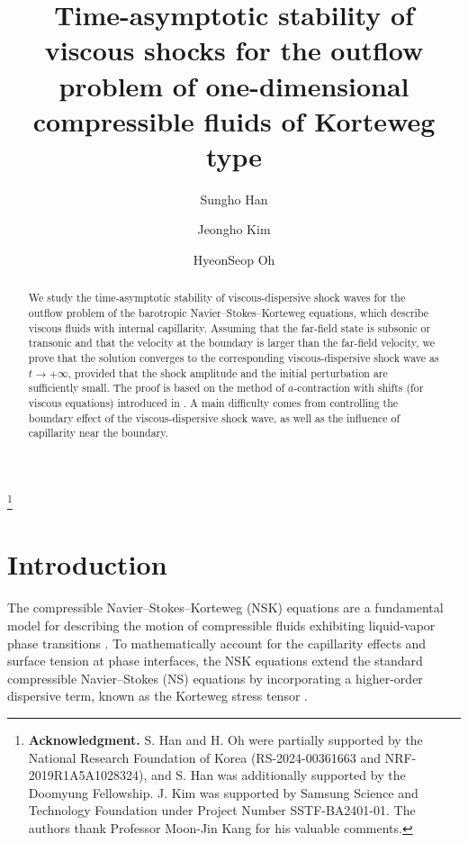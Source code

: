 \documentclass[11pt,reqno]{amsart}
\title[Outflow problem for the NSK equations]{Time-asymptotic stability of viscous shocks for the outflow problem of one-dimensional compressible fluids of Korteweg type}
\author[S. Han]{Sungho Han}
\author[J. Kim]{Jeongho Kim}
\author[H. Oh]{HyeonSeop Oh}
\numberwithin{equation}{section} %
\begin{document}


\thanks{\textbf{Acknowledgment.} S. Han and H. Oh were partially supported by the National Research Foundation of Korea (RS-2024-00361663 and NRF-2019R1A5A1028324), and S. Han was additionally supported by the Doomyung Fellowship. J. Kim was supported by Samsung Science and Technology Foundation under Project Number SSTF-BA2401-01. The authors thank Professor Moon-Jin Kang for his valuable comments.}

\begin{abstract} 
We study the time-asymptotic stability of viscous-dispersive shock waves for the outflow problem of the barotropic Navier--Stokes--Korteweg equations, which describe viscous fluids with internal capillarity. Assuming that the far-field state is subsonic or transonic and that the velocity at the boundary is larger than the far-field velocity, we prove that the solution converges to the corresponding viscous-dispersive shock wave as $t \to +\infty$, provided that the shock amplitude and the initial perturbation are sufficiently small. The proof is based on the method of $a$-contraction with shifts (for viscous equations) introduced in \cite{KV17,KV21,KVW23}. A main difficulty comes from controlling the boundary effect of the viscous-dispersive shock wave, as well as the influence of capillarity near the boundary.
\end{abstract}



\maketitle

\section{Introduction}%
\setcounter{equation}{0}

The compressible Navier--Stokes--Korteweg (NSK) equations are a fundamental model for describing the motion of compressible fluids exhibiting liquid-vapor phase transitions \cite{DS85, Kor01, VdW94}. To mathematically account for the capillarity effects and surface tension at phase interfaces, the NSK equations extend the standard compressible Navier--Stokes (NS) equations by incorporating a higher-order dispersive term, known as the Korteweg stress tensor \cite{BDD06, Kotschote08, Kotschote10}.
\end{document}
